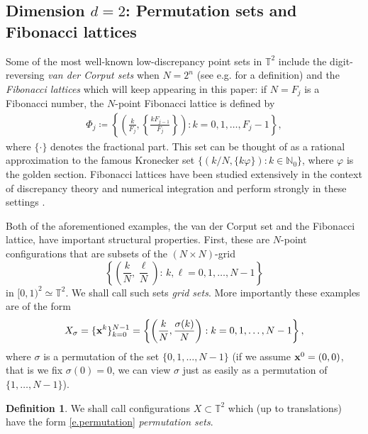 \documentclass[a4paper,12pt]{article}
\numberwithin{equation}{section}
\theoremstyle{definition}
\newtheorem{defi}[thm]{Definition}
\newcommand{\bbN}{\mathbb{N}}
\newcommand{\bbT}{\mathbb{T}}
\begin{document}
\subsection{Dimension $d=2$: Permutation sets and Fibonacci lattices} 

Some of the most well-known low-discrepancy point sets in $\bbT^2$ include the digit-reversing \emph{van der Corput sets} when $N = 2^n$  (see e.g. \cite{HKP21} for a definition) and the \emph{Fibonacci lattices} which  will keep appearing in  this paper: if $N = F_j$ is a Fibonacci number, the $N$-point Fibonacci lattice is defined by
\begin{align} \label{eq:fib_lat}
	\Phi_j \coloneqq \left\{\left(\frac{k}{F_j}, \left\{\frac{k F_{j-1}}{F_j}\right\}\right): k=0, 1, \dots, F_j-1\right\},
\end{align}
where $\{\cdot\}$ denotes the fractional part.  This set can be thought of as a rational approximation to the famous Kronecker set $\big\{  (k/N, \{ k \varphi \} ): k \in \bbN_0 \big\}$, where $\varphi$ is the golden section. Fibonacci lattices have been studied extensively in the context of discrepancy theory and numerical integration and perform strongly in these settings \cite{BTY12-2, BTY12-1}.

Both of the aforementioned examples, the van der Corput set and the Fibonacci lattice, have important structural properties. First, these are $N$-point configurations that are subsets of the $(N\times N)$-grid
$$
\left\{ \left( \frac{k}{N}, \frac{\ell}{N} \right): \, k, \ell = 0,1,\dots, N-1 \right\}
$$
in $ [0,1)^2 \simeq \mathbb T^2$. We shall call such sets  {\it grid sets}. More importantly these examples are of the form 
\begin{equation}\label{e.permutation}
X_\sigma = \{ {\bf x}^k \}_{k=0}^{N-1} = \left\{\left(\frac{k}{N}, \frac{\sigma (k) }{N}\right): k=0, 1, \dots, N-1\right\},
\end{equation}
where $\sigma$ is a permutation of the set $\{0,1,\dots, N-1\}$  (if we assume ${\bf x}^0 = (0,0)$, that is we fix $\sigma (0) = 0$, we can view $\sigma $ just as easily as a permutation of $\{ 1,\dots, N-1\}$).

\begin{defi}\label{def:perm_set}
We shall call configurations $X \subset \mathbb T^2$ which (up to translations) have the form \eqref{e.permutation}  {\emph{permutation sets}}.  %
\end{defi} 
\end{document}

